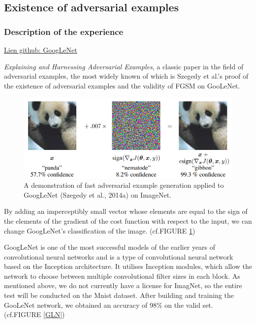\subsection{Existence of adversarial examples}
\subsubsection{ Description of the experience}

\href{https://github.com/LIUHanlin16895/MLA_projet/blob/main/src/existence_adv/GoogLeNet_existence_adv_examples.ipynb}{Lien github: GoogLeNet}

\textit{Explaining and Harnessing Adversarial Examples}\citep{goodfellow2014explaining}, a classic paper in the field of adversarial examples, the most widely known of which is Szegedy et al.'s proof of the existence of adversarial examples and the validity of FGSM on GooLeNet.

\FloatBarrier
\begin{figure}[htbp]%
        \centering
        \includegraphics[scale=0.3]{imagePanda.png}%
        \caption{ A demonstration of fast adversarial example generation applied to GoogLeNet (Szegedy et al., 2014a) on ImageNet.}
        \label{panda}
\end{figure}\par
\FloatBarrier

By adding an imperceptibly small vector whose elements are equal to the sign of the elements of the gradient of the cost function with respect to the input, we can change GoogLeNet’s classification of the image. (cf.FIGURE \ref{panda}) 

GoogLeNet is one of the most successful models of the earlier years of convolutional neural networks and is a type of convolutional neural network based on the Inception architecture. It utilises Inception modules, which allow the network to choose between multiple convolutional filter sizes in each block. As mentioned above, we do not currently have a license for ImagNet, so the entire test will be conducted on the Mnist dataset. After building and training the GooLeNet network, we obtained an accuracy of 98\% on the valid set. (cf.FIGURE \ref{GLN})

